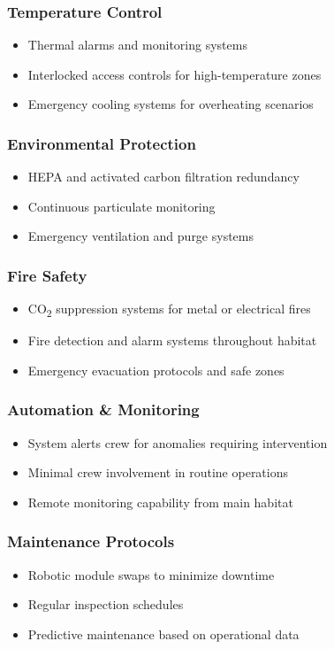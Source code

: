 \documentclass[12pt, a4paper]{article}
\begin{document}
\subsubsection{Temperature Control}
\begin{itemize}
    \item Thermal alarms and monitoring systems
    \item Interlocked access controls for high-temperature zones
    \item Emergency cooling systems for overheating scenarios
\end{itemize}

\subsubsection{Environmental Protection}
\begin{itemize}
    \item HEPA and activated carbon filtration redundancy
    \item Continuous particulate monitoring
    \item Emergency ventilation and purge systems
\end{itemize}

\subsubsection{Fire Safety}
\begin{itemize}
    \item CO\textsubscript{2} suppression systems for metal or electrical fires
    \item Fire detection and alarm systems throughout habitat
    \item Emergency evacuation protocols and safe zones
\end{itemize}

\subsubsection{Automation \& Monitoring}
\begin{itemize}
    \item System alerts crew for anomalies requiring intervention
    \item Minimal crew involvement in routine operations
    \item Remote monitoring capability from main habitat
\end{itemize}

\subsubsection{Maintenance Protocols}
\begin{itemize}
    \item Robotic module swaps to minimize downtime
    \item Regular inspection schedules
    \item Predictive maintenance based on operational data
\end{itemize}
\end{document}
